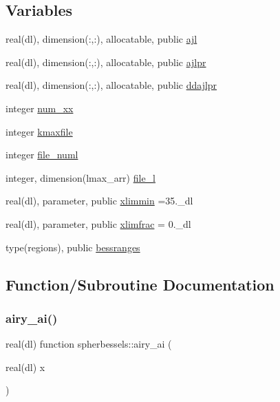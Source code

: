 \subsection*{Variables}
\begin{DoxyCompactItemize}
\item 
real(dl), dimension(\+:,\+:), allocatable, public \mbox{\hyperlink{namespacespherbessels_ad90cf19f2544f8107ae70ec1b4cd64e0}{ajl}}
\item 
real(dl), dimension(\+:,\+:), allocatable, public \mbox{\hyperlink{namespacespherbessels_aafb6422b5aab90f84fdb3a955c129874}{ajlpr}}
\item 
real(dl), dimension(\+:,\+:), allocatable, public \mbox{\hyperlink{namespacespherbessels_a90a7acde21383c40c841e0a11e87526f}{ddajlpr}}
\item 
integer \mbox{\hyperlink{namespacespherbessels_af8cc74b859928826e087b37b4c365afa}{num\+\_\+xx}}
\item 
integer \mbox{\hyperlink{namespacespherbessels_acaac392a6ea328fe36eff8c422ff06ea}{kmaxfile}}
\item 
integer \mbox{\hyperlink{namespacespherbessels_ab9b99f417336f962381e26fc7611affa}{file\+\_\+numl}}
\item 
integer, dimension(lmax\+\_\+arr) \mbox{\hyperlink{namespacespherbessels_abe559ecdb38e3d5173cbf2c709b7a694}{file\+\_\+l}}
\item 
real(dl), parameter, public \mbox{\hyperlink{namespacespherbessels_a7609b1d2bbb03aefd6c6f47a69538eed}{xlimmin}} =35.\+\_\+dl
\item 
real(dl), parameter, public \mbox{\hyperlink{namespacespherbessels_a07d278e5f2a51b79893a106358cb1afc}{xlimfrac}} = 0.\+\_\+dl
\item 
type(regions), public \mbox{\hyperlink{namespacespherbessels_a3ae9c132f8c8a13f8d061492485272b8}{bessranges}}
\end{DoxyCompactItemize}


\subsection{Function/\+Subroutine Documentation}
\mbox{\label{namespacespherbessels_a4a053c46f90faa3400f9619fc31cbd1d}} 
\subsubsection{\texorpdfstring{airy\+\_\+ai()}{airy\_ai()}}
{\footnotesize\ttfamily real(dl) function spherbessels\+::airy\+\_\+ai (\begin{DoxyParamCaption}\item[{real(dl)}]{x }\end{DoxyParamCaption})\hspace{0.3cm}{\ttfamily [private]}}



